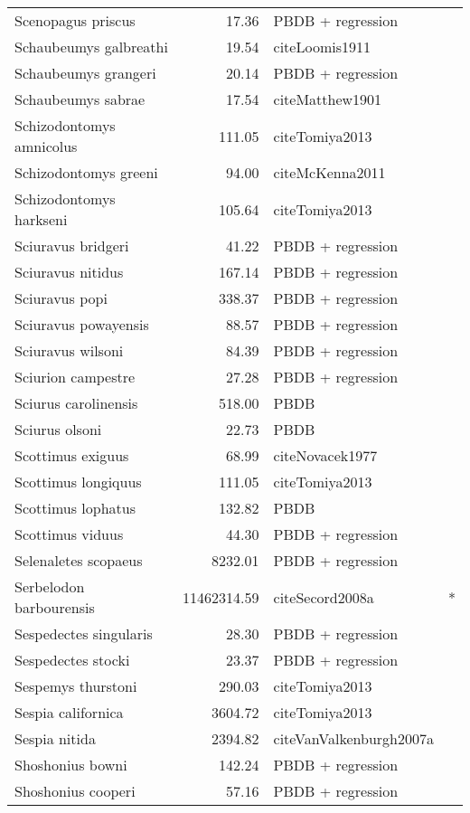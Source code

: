 \begin{table}[ht]
\begin{tabular}{lrll}
  Scenopagus priscus & 17.36 & PBDB + regression &  \\ 
  Schaubeumys galbreathi & 19.54 & cite{Loomis1911} &  \\ 
  Schaubeumys grangeri & 20.14 & PBDB + regression &  \\ 
  Schaubeumys sabrae & 17.54 & cite{Matthew1901} &  \\ 
  Schizodontomys amnicolus & 111.05 & cite{Tomiya2013} &  \\ 
  Schizodontomys greeni & 94.00 & cite{McKenna2011} &  \\ 
  Schizodontomys harkseni & 105.64 & cite{Tomiya2013} &  \\ 
  Sciuravus bridgeri & 41.22 & PBDB + regression &  \\ 
  Sciuravus nitidus & 167.14 & PBDB + regression &  \\ 
  Sciuravus popi & 338.37 & PBDB + regression &  \\ 
  Sciuravus powayensis & 88.57 & PBDB + regression &  \\ 
  Sciuravus wilsoni & 84.39 & PBDB + regression &  \\ 
  Sciurion campestre & 27.28 & PBDB + regression &  \\ 
  Sciurus carolinensis & 518.00 & PBDB &  \\ 
  Sciurus olsoni & 22.73 & PBDB &  \\ 
  Scottimus exiguus & 68.99 & cite{Novacek1977} &  \\ 
  Scottimus longiquus & 111.05 & cite{Tomiya2013} &  \\ 
  Scottimus lophatus & 132.82 & PBDB &  \\ 
  Scottimus viduus & 44.30 & PBDB + regression &  \\ 
  Selenaletes scopaeus & 8232.01 & PBDB + regression &  \\ 
  Serbelodon barbourensis & 11462314.59 & cite{Secord2008a} & * \\ 
  Sespedectes singularis & 28.30 & PBDB + regression &  \\ 
  Sespedectes stocki & 23.37 & PBDB + regression &  \\ 
  Sespemys thurstoni & 290.03 & cite{Tomiya2013} &  \\ 
  Sespia californica & 3604.72 & cite{Tomiya2013} &  \\ 
  Sespia nitida & 2394.82 & cite{VanValkenburgh2007a} &  \\ 
  Shoshonius bowni & 142.24 & PBDB + regression &  \\ 
  Shoshonius cooperi & 57.16 & PBDB + regression &  \\ 

\end{tabular}
\end{table}
